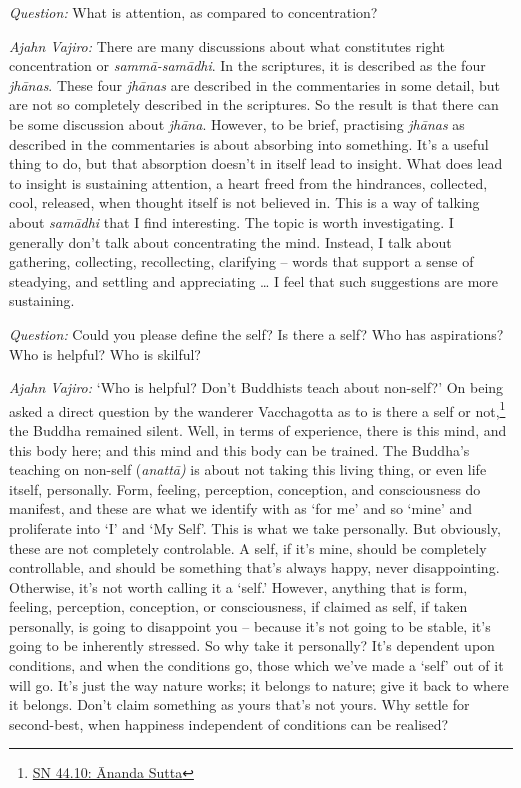 \clearpage

\enlargethispage{2\baselineskip}

\emph{Question:} What is attention, as compared to concentration?

\emph{Ajahn Vajiro:} There are many discussions about what constitutes right
concentration or \emph{sammā-samādhi}. In the scriptures, it is described as the
four \emph{jhānas}. These four \emph{jhānas} are described in the commentaries
in some detail, but are not so completely described in the scriptures. So the
result is that there can be some discussion about \emph{jhāna}. However, to be
brief, practising \emph{jhānas} as described in the commentaries is about
absorbing into something. It's a useful thing to do, but that absorption doesn't
in itself lead to insight. What does lead to insight is sustaining attention, a
heart freed from the hindrances, collected, cool, released, when thought itself
is not believed in. This is a way of talking about \emph{samādhi} that I find
interesting. The topic is worth investigating. I generally don't talk about
concentrating the mind. Instead, I talk about gathering, collecting,
recollecting, clarifying -- words that support a sense of steadying, and
settling and appreciating \ldots{} I feel that such suggestions are more
sustaining.

\bigskip

\emph{Question:} Could you please define the self? Is there a self? Who has
aspirations? Who is helpful? Who is skilful?

\emph{Ajahn Vajiro:} `Who is helpful? Don't Buddhists teach about non-self?' On being
asked a direct question by the wanderer Vacchagotta as to is there a self or not,\footnote{\href{https://suttacentral.net/sn44.10/en/bodhi}{SN 44.10: Ānanda Sutta}} the Buddha remained silent. Well, in terms of experience,
there is this mind, and this body here; and this mind and this body can be
trained. The Buddha's teaching on non-self (\emph{anattā)} is about not taking
this living thing, or even life itself, personally. Form, feeling, perception,
conception, and consciousness do manifest, and these are what we identify with
as `for me' and so `mine' and proliferate into `I' and `My Self'. This is what we take personally. But obviously, these
are not completely controlable. A self, if it's mine, should be completely
controllable, and should be something that's always happy, never disappointing.
Otherwise, it's not worth calling it a `self.' However, anything that is form,
feeling, perception, conception, or consciousness, if claimed as self, if taken
personally, is going to disappoint you -- because it's not going to be stable,
it's going to be inherently stressed. So why take it personally? It's dependent
upon conditions, and when the conditions go, those which we've made a `self' out of
it will go. It's just the way nature works; it belongs to nature; give it back
to where it belongs. Don't claim something as yours that's not yours. Why settle
for second-best, when happiness independent of conditions can be realised?

